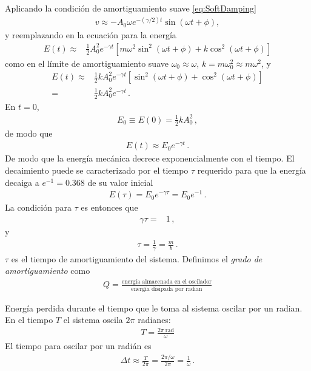 Aplicando la condición de amortiguamiento suave \eqref{eq:SoftDamping}
\begin{align*}
v\approx  -A_0 \omega e^{-(\gamma/2)t} \sin(\omega t+\phi),
\end{align*}
y reemplazando en la ecuación para la energía 
\begin{align*}
  E(t)\approx&\tfrac{1}{2}A_0^2 e^{-\gamma t} \left[
m\omega^2 \sin^2(\omega t+\phi)+k\cos^2(\omega t+\phi)\right]
\end{align*}
como en el límite de amortiguamiento suave $\omega_0\approx \omega$, $k=m\omega_0^2\approx m\omega^2$, y
\begin{align*}
  E(t)\approx&\tfrac{1}{2}k A_0^2 e^{-\gamma t} \left[
 \sin^2(\omega t+\phi)+\cos^2(\omega t+\phi)\right]\nonumber\\
=&\tfrac{1}{2}k A_0^2 e^{-\gamma t}\,.
\end{align*}
En $t=0$,
\begin{align*}
 E_0\equiv E(0)=\tfrac{1}{2}k A_0^2 \,,
\end{align*}
de modo que
\begin{align*}
  E(t)\approx E_0 e^{-\gamma t}\,.
\end{align*}
De modo que la energía mecánica decrece exponencialmente con el tiempo.  El decaimiento puede se caracterizado por el tiempo $\tau$ requerido para que la energía decaiga a $e^{-1}=0.368$ de su valor inicial %
\begin{align*}
  E(\tau)=E_0 e^{-\gamma \tau}=E_0 e^{-1}\,.
\end{align*}
La condición para $\tau$ es entonces que
\begin{align*}
  \gamma \tau=&1\,,
\end{align*}
y
\begin{align}
  \label{eq:vidamedia}
  \tau=\frac{1}{\gamma}=\frac{m}{b}\,.
\end{align}
$\tau$ es el tiempo de amortiguamiento del sistema. Definimos el \emph{grado de amortiguamiento} como
\begin{align*}
  Q=\frac{\text{energía almacenada en el oscilador}}{\text{energía disipada por radian}}
\end{align*}

Energía perdida durante el tiempo que le toma al sistema oscilar por un radian.  En el tiempo $T$ el sistema oscila $2\pi$ radianes:
\begin{align*}
  T=\frac{2\pi\ \text{rad}}{\omega}
\end{align*}
El tiempo para oscilar por un radián es
\begin{align*}
  \Delta t\approx \frac{T}{2\pi}=\frac{2\pi/\omega}{2\pi}=\frac{1}{\omega}\,.
\end{align*}

